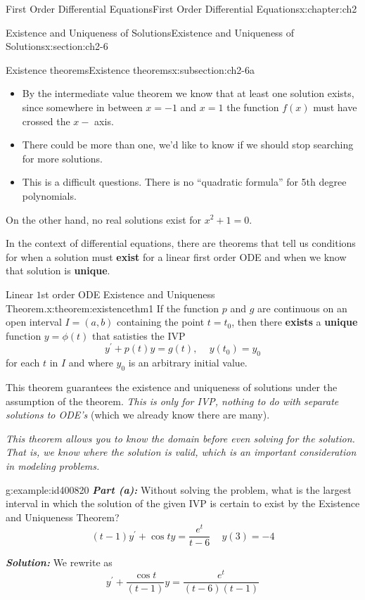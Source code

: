 \documentclass[oneside,10pt,]{book}
\newcommand{\alert}[1]{\textbf{\textit{#1}}}
\newcommand{\terminology}[1]{\textbf{#1}}
\numberwithin{equation}{section}
\numberwithin{equation}{section}
\begin{document}
\begin{chapterptx}{First Order Differential Equations}{}{First Order Differential Equations}{}{}{x:chapter:ch2}
\begin{sectionptx}{Existence and Uniqueness of Solutions}{}{Existence and Uniqueness of Solutions}{}{}{x:section:ch2-6}
\begin{subsectionptx}{Existence theorems}{}{Existence theorems}{}{}{x:subsection:ch2-6a}
\begin{itemize}[label=\textbullet]
\item{}By the intermediate value theorem we know that at least one solution exists, since somewhere in between \(x=-1\) and \(x=1\) the function \(f(x)\) must have crossed the \(x-\) axis.%
\item{}There could be more than one, we'd like to know if we should stop searching for more solutions.%
\item{}This is a difficult questions. There is no ``quadratic formula'' for 5th degree polynomials.%
\end{itemize}
On the other hand, no real solutions exist for \(x^{2}+1=0\).%
\par
In the context of differential equations, there are theorems that tell us conditions for when a solution must \terminology{exist} for a linear first order ODE and when we know that solution is \terminology{unique}.%
\begin{theorem}{Linear \(1\)st order ODE Existence and Uniqueness Theorem.}{}{x:theorem:existencethm1}%
If the function \(p\) and \(g\) are continuous on an open interval \(I=(a,b)\)      containing the point \(t=t_{0}\), then there \terminology{exists} a \terminology{unique} function \(y=\phi(t)\) that satisties the IVP%
\begin{equation*}
y^{\prime}+p(t)y=g(t),\,\,\,\,\,\,\,y(t_{0})=y_{0}
\end{equation*}
for each \(t\) in \(I\) and where \(y_{0}\) is an arbitrary initial value.%
\end{theorem}
This theorem guarantees the existence and uniqueness of solutions under the assumption of the theorem. \emph{This is only for IVP, nothing to do with separate solutions to ODE's} (which we already know there are many).%
\par
\emph{This theorem allows you to know the domain before even solving for the solution. That is, we know where the solution is valid, which is an important consideration in modeling problems.}%
\begin{example}{}{g:example:id400820}%
\alert{Part (a):} Without solving the problem, what is the largest interval in which the solution of the given IVP is certain to exist by the Existence and Uniqueness Theorem?%
\begin{equation*}
(t-1)y^{\prime}+\cos ty=\frac{e^{t}}{t-6}\,\,\,\,\,\,\,y(3)=-4
\end{equation*}
%
\par
\alert{Solution:} We rewrite as%
\begin{equation*}
y^{\prime}+\frac{\cos t}{(t-1)}y=\frac{e^{t}}{\left(t-6\right)(t-1)}

\end{equation*}
\end{example}
\end{subsectionptx}
\end{sectionptx}
\end{chapterptx}
\end{document}
